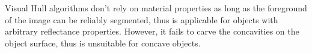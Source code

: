 Visual Hull algorithms don't rely on material properties as long as the foreground of the image can be reliably segmented, thus is applicable for objects with arbitrary reflectance properties. However, it fails to carve the concavities on the object surface, thus is unsuitable for concave objects.




